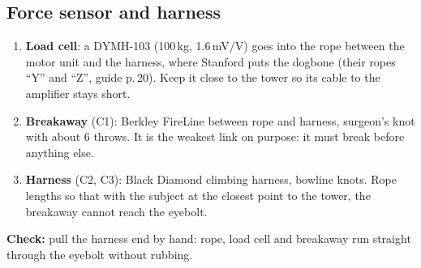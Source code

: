 \subsection{Force sensor and harness}
\begin{enumerate}
\item \textbf{Load cell}: a DYMH-103 (100\,kg, 1.6\,mV/V) goes into the rope between the motor unit and the
harness, where Stanford puts the dogbone (their ropes ``Y'' and ``Z'', guide p.\,20). Keep it close to the
tower so its cable to the amplifier stays short.
\item \textbf{Breakaway} (C1): Berkley FireLine between rope and harness, surgeon's knot with about 6 throws.
It is the weakest link on purpose: it must break before anything else.
\item \textbf{Harness} (C2, C3): Black Diamond climbing harness, bowline knots. Rope lengths so that with the
subject at the closest point to the tower, the breakaway cannot reach the eyebolt.
\end{enumerate}
\textbf{Check:} pull the harness end by hand: rope, load cell and breakaway run straight through the eyebolt
without rubbing.
